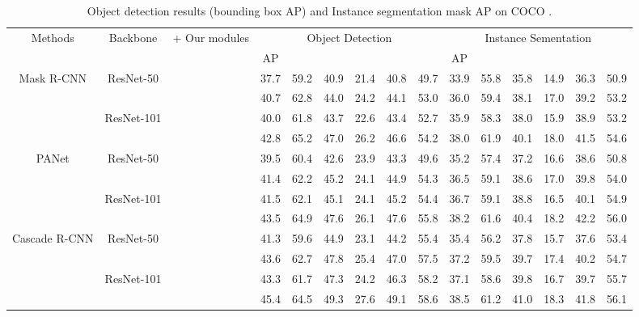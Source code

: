 \documentclass[journal]{IEEEtran}
\def\qcr{\fontfamily{qcr}\selectfont}
\begin{document}
	\begin{table*}[t]
		\centering
		\caption{Object detection
results (bounding box AP) and Instance segmentation mask AP on COCO {\qcr{minival}}.}
{
			\begin{tabular}{c|c|c|cccccc|cccccc}
				\toprule
				\multirow{2}[4]{*}{Methods} & \multirow{2}[4]{*}{Backbone} & \multicolumn{1}{r|}{\multirow{2}[4]{*}{ + Our modules}} & \multicolumn{6}{c|}{Object Detection}                & \multicolumn{6}{c}{Instance Sementation} \\
				\cline{4-15}   &       &       & AP    &  &  &  &  &  & AP   &  &  &  &  &  \\
				\hline
				\multirow{4}[4]{*}{Mask R-CNN} & \multirow{2}[2]{*}{ResNet-50} &       & 37.7  & 59.2  & 40.9  & 21.4  & 40.8  & 49.7  & 33.9  & 55.8  & 35.8  & 14.9  & 36.3  & 50.9 \\
				&       &      &  40.7  &  62.8   & 44.0  &  24.2 &  44.1  &  53.0  &  36.0  &  59.4  &  38.1 & 17.0  &   39.2    & 53.2  \\
				\cline{2-15}          & \multirow{2}[2]{*}{ResNet-101} &       & 40.0 & 61.8  & 43.7 & 22.6 & 43.4 & 52.7 & 35.9 & 58.3  & 38.0 & 15.9 & 38.9 & 53.2 \\
				&       &       & 42.8  & 65.2  & 47.0  & 26.2 & 46.6 & 54.2 & 38.0  & 61.9 & 40.1 & 18.0 & 41.5 &  54.6\\
				\hline
				\multirow{4}[4]{*}{PANet} & \multirow{2}[2]{*}{ResNet-50} &       & 39.5  & 60.4 &  42.6 & 23.9 & 43.3 & 49.6 &   35.2 &  57.4 & 37.2 & 16.6 & 38.6 & 50.8 \\
				&       &       &  41.4 & 62.2 & 45.2  & 24.1 & 44.9 & 54.3  & 36.5 & 59.1   & 38.6 & 17.0 & 39.8  & 54.0 \\
				\cline{2-15}          & \multirow{2}[2]{*}{ResNet-101} &       & 41.5 & 62.1 & 45.1 & 24.1   & 45.2 & 54.4 & 36.7 & 59.1 & 38.8 & 16.5 & 40.1 & 54.9 \\
				&       &       & 43.5 & 64.9 & 47.6 & 26.1 & 47.6 & 55.8 & 38.2 & 61.6 &     40.4  & 18.2 & 42.2 & 56.0  \\
				\hline
				\multirow{4}[4]{*}{Cascade R-CNN} & \multirow{2}[2]{*}{ResNet-50} &       & 41.3 & 59.6 & 44.9 & 23.1 & 44.2 & 55.4 & 35.4 & 56.2 & 37.8  & 15.7 & 37.6 & 53.4 \\
				&       &       & 43.6 & 62.7 & 47.8 & 25.4 & 47.0 & 57.5 & 37.2 & 59.5 & 39.7 &   17.4 & 40.2 & 54.7 \\
				\cline{2-15}          & \multirow{2}[2]{*}{ResNet-101} &       & 43.3 & 61.7 & 47.3 & 24.2 & 46.3 & 58.2 & 37.1  & 58.6 & 39.8 & 16.7 & 39.7 & 55.7 \\
				&       &       &  45.4 & 64.5 & 49.3 & 27.6 & 49.1 & 58.6 & 38.5 & 61.2 &    41.0 & 18.3 & 41.8 & 56.1 \\
				\bottomrule
		\end{tabular}}
		\label{tab:instance_segmentation_minival}\end{table*}
\end{document}
